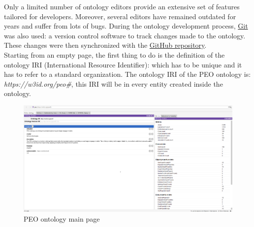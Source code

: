 Only a limited number of ontology editors provide an extensive set of features tailored for developers. Moreover, several editors have remained outdated for years and suffer from lots of bugs. During the ontology development process, \href{https://git-scm.com/}{Git} was also used: a version control software to track changes made to the ontology. These changes were then synchronized with the \href{https://github.com/simonegramegna/peo_ontology}{GitHub repository}.\\
Starting from an empty page, the first thing to do is the definition of the ontology IRI (International Resource Identifier): which has to be unique and it has to refer to a standard organization. The ontology IRI of the PEO ontology is: \textit{https://w3id.org/peo\#}, this IRI will be in every entity created inside the ontology.

\begin{figure}[H]
    \centering
    \includegraphics[width=1.0\linewidth]{Figures/fig_29.png}
    \caption{PEO ontology main page}
    \label{fig:enter-label}
\end{figure}

